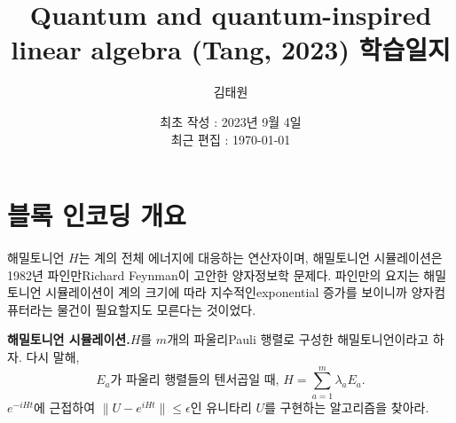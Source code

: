 \documentclass[a4paper,atbegshi,chapter]{oblivoir}
\title{\Large Quantum and quantum-inspired linear algebra (Tang, 2023) 학습일지}
\author{김태원}
\date{최초 작성 : 2023년 9월 4일 \\ 최근 편집 : \today}
\begin{document}
\maketitle
\chapter{블록 인코딩 개요}
해밀토니언 $H$는 계의 전체 에너지에 대응하는 연산자이며, 해밀토니언 시뮬레이션은
1982년 파인만{\tiny Richard Feynman}이 고안한 양자정보학 문제다. 파인만의 요지는
해밀토니언 시뮬레이션이 계의 크기에 따라 지수적인{\tiny exponential} 증가를
보이니까 양자컴퓨터라는 물건이 필요할지도 모른다는 것이었다.
\begin{mdframed}
\textbf{해밀토니언 시뮬레이션.}\quad $H$를 $m$개의 파울리{\tiny Pauli} 행렬로
구성한 해밀토니언이라고 하자. 다시 말해,
    \[
      E_a\textrm{가 파울리 행렬들의 텐서곱일 때, }H = \sum_{a=1}^m\lambda_a E_a.
    \]
$e^{-iHt}$에 근접하여 $\|U-e^{iHt}\|\leq\epsilon$인 유니타리 $U$를 구현하는
알고리즘을 찾아라.
\end{mdframed}
\end{document}
